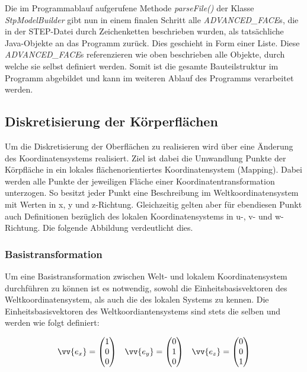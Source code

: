 Die im Programmablauf aufgerufene Methode \textit{parseFile()} der Klasse \textit{StpModelBuilder} gibt nun in einem finalen Schritt alle \textit{ADVANCED\_FACE}s, die in der STEP-Datei durch Zeichenketten beschrieben wurden, als tatsächliche Java-Objekte an das Programm zurück. Dies geschieht in Form einer Liste.  Diese \textit{ADVANCED\_FACE}s  referenzieren wie oben beschrieben alle Objekte, durch welche sie selbst definiert werden. Somit ist die gesamte Bauteilstruktur im Programm abgebildet und kann im weiteren Ablauf des Programms verarbeitet werden.

\subsection{Diskretisierung der Körperflächen}

Um die Diskretisierung der Oberflächen zu realisieren wird über eine Änderung des Koordinatensystems realisiert. Ziel ist dabei die Umwandlung Punkte der Körpfläche in ein lokales flächenorientiertes Koordinatensystem (Mapping). Dabei werden alle Punkte der jeweiligen Fläche einer Koordinatentransformation unterzogen. So besitzt jeder Punkt eine Beschreibung im Weltkoordinatensystem mit Werten in x, y und z-Richtung. Gleichzeitig gelten aber für ebendiesen Punkt auch Definitionen bezüglich des lokalen Koordinatensystems in u-, v- und w-Richtung. Die folgende Abbildung verdeutlicht dies.
 
\subsubsection{Basistransformation}

Um eine Basistransformation zwischen Welt- und lokalem Koordinatensystem durchführen zu können ist es notwendig, sowohl die Einheitsbasisvektoren des Weltkoordinatensystem, als auch die des lokalen Systems zu kennen. Die Einheitsbasisvektoren des Weltkoordiantensystems sind stets die selben und werden wie folgt definiert:

\begin{singlespace}
\begin{equation}
\begin{aligned}
\vv{e_{x}}=\begin{pmatrix}
1 \\ 
0 \\ 
0
\end{pmatrix}  
&& 
\vv{e_{y}}=\begin{pmatrix}
0 \\ 
1 \\ 
0
\end{pmatrix}  
&& 
\vv{e_{z}}=\begin{pmatrix}
0 \\ 
0 \\ 
1
\end{pmatrix} 
\end{aligned}
\end{equation}
\end{singlespace}

